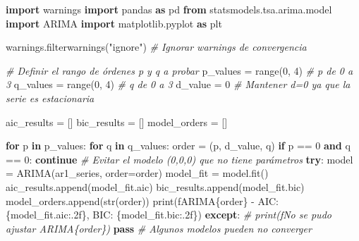 \documentclass[
  11pt,
]{article}
\newenvironment{Shaded}{}{}
\newcommand{\BuiltInTok}[1]{\textcolor[rgb]{0.00,0.50,0.00}{#1}}
\newcommand{\CommentTok}[1]{\textcolor[rgb]{0.38,0.63,0.69}{\textit{#1}}}
\newcommand{\ControlFlowTok}[1]{\textcolor[rgb]{0.00,0.44,0.13}{\textbf{#1}}}
\newcommand{\DecValTok}[1]{\textcolor[rgb]{0.25,0.63,0.44}{#1}}
\newcommand{\ImportTok}[1]{\textcolor[rgb]{0.00,0.50,0.00}{\textbf{#1}}}
\newcommand{\KeywordTok}[1]{\textcolor[rgb]{0.00,0.44,0.13}{\textbf{#1}}}
\newcommand{\NormalTok}[1]{#1}
\newcommand{\OperatorTok}[1]{\textcolor[rgb]{0.40,0.40,0.40}{#1}}
\newcommand{\SpecialCharTok}[1]{\textcolor[rgb]{0.25,0.44,0.63}{#1}}
\newcommand{\SpecialStringTok}[1]{\textcolor[rgb]{0.73,0.40,0.53}{#1}}
\newcommand{\StringTok}[1]{\textcolor[rgb]{0.25,0.44,0.63}{#1}}
\begin{document}
\begin{Shaded}
\begin{Highlighting}[]
\ImportTok{import}\NormalTok{ warnings}
\ImportTok{import}\NormalTok{ pandas }\ImportTok{as}\NormalTok{ pd}
\ImportTok{from}\NormalTok{ statsmodels.tsa.arima.model }\ImportTok{import}\NormalTok{ ARIMA}
\ImportTok{import}\NormalTok{ matplotlib.pyplot }\ImportTok{as}\NormalTok{ plt}

\NormalTok{warnings.filterwarnings(}\StringTok{"ignore"}\NormalTok{) }\CommentTok{\# Ignorar warnings de convergencia}

\CommentTok{\# Definir el rango de órdenes p y q a probar}
\NormalTok{p\_values }\OperatorTok{=} \BuiltInTok{range}\NormalTok{(}\DecValTok{0}\NormalTok{, }\DecValTok{4}\NormalTok{) }\CommentTok{\# p de 0 a 3}
\NormalTok{q\_values }\OperatorTok{=} \BuiltInTok{range}\NormalTok{(}\DecValTok{0}\NormalTok{, }\DecValTok{4}\NormalTok{) }\CommentTok{\# q de 0 a 3}
\NormalTok{d\_value }\OperatorTok{=} \DecValTok{0} \CommentTok{\# Mantener d=0 ya que la serie es estacionaria}

\NormalTok{aic\_results }\OperatorTok{=}\NormalTok{ []}
\NormalTok{bic\_results }\OperatorTok{=}\NormalTok{ []}
\NormalTok{model\_orders }\OperatorTok{=}\NormalTok{ []}

\ControlFlowTok{for}\NormalTok{ p }\KeywordTok{in}\NormalTok{ p\_values:}
    \ControlFlowTok{for}\NormalTok{ q }\KeywordTok{in}\NormalTok{ q\_values:}
\NormalTok{        order }\OperatorTok{=}\NormalTok{ (p, d\_value, q)}
        \ControlFlowTok{if}\NormalTok{ p }\OperatorTok{==} \DecValTok{0} \KeywordTok{and}\NormalTok{ q }\OperatorTok{==} \DecValTok{0}\NormalTok{:}
            \ControlFlowTok{continue} \CommentTok{\# Evitar el modelo (0,0,0) que no tiene parámetros}
        \ControlFlowTok{try}\NormalTok{:}
\NormalTok{            model }\OperatorTok{=}\NormalTok{ ARIMA(ar1\_series, order}\OperatorTok{=}\NormalTok{order)}
\NormalTok{            model\_fit }\OperatorTok{=}\NormalTok{ model.fit()}
\NormalTok{            aic\_results.append(model\_fit.aic)}
\NormalTok{            bic\_results.append(model\_fit.bic)}
\NormalTok{            model\_orders.append(}\BuiltInTok{str}\NormalTok{(order))}
            \BuiltInTok{print}\NormalTok{(}\SpecialStringTok{f\textquotesingle{}ARIMA}\SpecialCharTok{\{}\NormalTok{order}\SpecialCharTok{\}}\SpecialStringTok{ {-} AIC: }\SpecialCharTok{\{}\NormalTok{model\_fit}\SpecialCharTok{.}\NormalTok{aic}\SpecialCharTok{:.2f\}}\SpecialStringTok{, BIC: }\SpecialCharTok{\{}\NormalTok{model\_fit}\SpecialCharTok{.}\NormalTok{bic}\SpecialCharTok{:.2f\}}\SpecialStringTok{\textquotesingle{}}\NormalTok{)}
        \ControlFlowTok{except}\NormalTok{:}
            \CommentTok{\# print(f\textquotesingle{}No se pudo ajustar ARIMA\{order\}\textquotesingle{})}
            \ControlFlowTok{pass} \CommentTok{\# Algunos modelos pueden no converger}


\end{Highlighting}
\end{Shaded}
\end{document}
